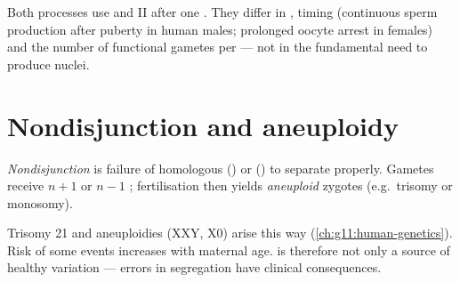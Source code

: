 \begin{proposition}
\label{prop:g11:meiosis-life-cycles:gameto-vs}
Both processes use  and II after one . They differ in
, timing (continuous sperm production after puberty in human males;
prolonged oocyte arrest in females) and the number of functional gametes per
 --- not in the fundamental need to produce  nuclei.
\end{proposition}
\admitted

\section{Nondisjunction and aneuploidy}

\begin{definition}
\label{def:g11:meiosis-life-cycles:nondisjunction}
\emph{Nondisjunction} is failure of homologous 
() or  () to separate properly. Gametes
receive $n+1$ or $n-1$ ; fertilisation then yields
\emph{aneuploid} zygotes (e.g.\ trisomy or monosomy).
\end{definition}

\begin{remark}
\label{rem:g11:meiosis-life-cycles:aneuploidy-link}
Trisomy 21 and  aneuploidies (XXY, X0) arise this way
(\cref{ch:g11:human-genetics}). Risk of some  events increases
with maternal age.  is therefore not only a source of healthy
variation --- errors in segregation have clinical consequences.
\end{remark}

